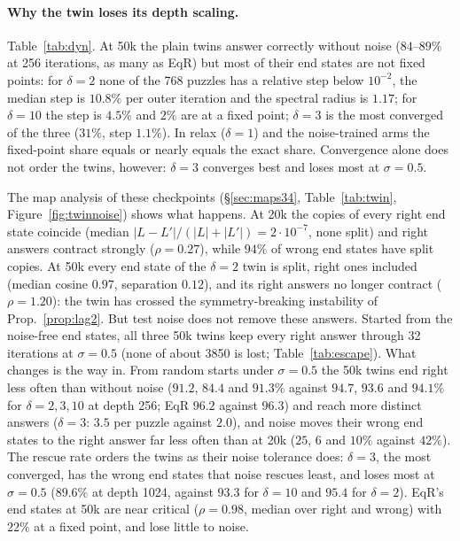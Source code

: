 \documentclass[11pt]{article}
\theoremstyle{definition}
\begin{document}
\paragraph{Why the twin loses its depth scaling.} Table~\ref{tab:dyn}. At 50k the plain twins answer correctly without noise
($84$--$89\%$ at 256 iterations, as many as EqR) but most of their end states are not fixed points: for $\delta=2$ none of the 768 puzzles
has a relative step below $10^{-2}$, the median step is $10.8\%$ per outer iteration and the spectral radius is $1.17$; for $\delta=10$ the
step is $4.5\%$ and $2\%$ are at a fixed point; $\delta=3$ is the most converged of the three ($31\%$, step $1.1\%$). In relax ($\delta=1$)
and the noise-trained arms the fixed-point share equals or nearly equals the exact share. Convergence alone does not order the twins,
however: $\delta=3$ converges best and loses most at $\sigma=0.5$.

The map analysis of these checkpoints (\S\ref{sec:maps34}, Table~\ref{tab:twin}, Figure~\ref{fig:twinnoise}) shows what happens. At 20k
the copies of every right end state coincide (median $|L-L'|/(|L|+|L'|)=2\cdot10^{-7}$, none split) and right answers contract strongly
($\rho=0.27$), while $94\%$ of wrong end states have split copies. At 50k every end state of the $\delta=2$ twin is split, right ones included
(median cosine $0.97$, separation $0.12$), and its right answers no longer contract ($\rho=1.20$): the twin has crossed the symmetry-breaking
instability of Prop.~\ref{prop:lag2}. But test noise does not remove these answers. Started from the noise-free end states, all three 50k
twins keep every right answer through 32 iterations at $\sigma=0.5$ (none of about 3850 is lost; Table~\ref{tab:escape}). What changes is the
way in. From random starts under $\sigma=0.5$ the 50k twins end right less often than without noise ($91.2$, $84.4$ and $91.3\%$ against $94.7$,
$93.6$ and $94.1\%$ for $\delta=2,3,10$ at depth 256; EqR $96.2$ against $96.3$) and reach more distinct answers ($\delta=3$: $3.5$ per puzzle
against $2.0$), and noise moves their wrong end states to the right answer far less often than at 20k ($25$, $6$ and $10\%$ against $42\%$).
The rescue rate orders the twins as their noise tolerance does: $\delta=3$, the most converged, has the wrong end states that noise rescues
least, and loses most at $\sigma=0.5$ ($89.6\%$ at depth 1024, against $93.3$ for $\delta=10$ and $95.4$ for $\delta=2$). EqR's end states at
50k are near critical ($\rho=0.98$, median over right and wrong) with $22\%$ at a fixed point, and lose little to noise.
\end{document}
